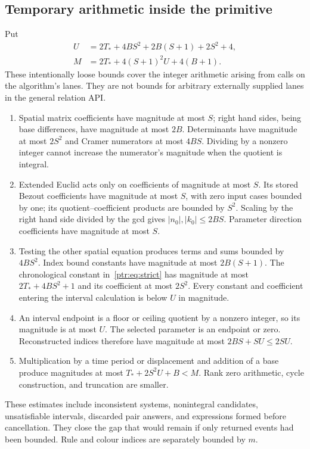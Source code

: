 \documentclass[11pt,letterpaper]{article}
\theoremstyle{definition}\newtheorem{definition}[theorem]{Definition}
\theoremstyle{remark}\newtheorem{remark}[theorem]{Remark}
\begin{document}
\subsection{Temporary arithmetic inside the primitive}
Put
\begin{align}\label{ptr:eq:intermediate}
 U&=2T_*+4BS^2+2B(S+1)+2S^2+4,\\
 M&=2T_*+4(S+1)^2U+4(B+1).\nonumber
\end{align}
These intentionally loose bounds cover the integer arithmetic arising from calls on the algorithm's lanes. They are not bounds for arbitrary externally supplied lanes in the general relation API.
\begin{enumerate}
\item Spatial matrix coefficients have magnitude at most $S$; right hand sides, being base differences, have magnitude at most $2B$. Determinants have magnitude at most $2S^2$ and Cramer numerators at most $4BS$. Dividing by a nonzero integer cannot increase the numerator's magnitude when the quotient is integral.
\item Extended Euclid acts only on coefficients of magnitude at most $S$. Its stored Bezout coefficients have magnitude at most $S$, with zero input cases bounded by one; its quotient--coefficient products are bounded by $S^2$. Scaling by the right hand side divided by the gcd gives $|n_0|,|k_0|\le2BS$. Parameter direction coefficients have magnitude at most $S$.
\item Testing the other spatial equation produces terms and sums bounded by $4BS^2$. Index bound constants have magnitude at most $2B(S+1)$. The chronological constant in~\eqref{ptr:eq:strict} has magnitude at most $2T_*+4BS^2+1$ and its coefficient at most $2S^2$. Every constant and coefficient entering the interval calculation is below $U$ in magnitude.
\item An interval endpoint is a floor or ceiling quotient by a nonzero integer, so its magnitude is at most $U$. The selected parameter is an endpoint or zero. Reconstructed indices therefore have magnitude at most $2BS+SU\le2SU$.
\item Multiplication by a time period or displacement and addition of a base produce magnitudes at most $T_*+2S^2U+B<M$. Rank zero arithmetic, cycle construction, and truncation are smaller.
\end{enumerate}
These estimates include inconsistent systems, nonintegral candidates, unsatisfiable intervals, discarded pair answers, and expressions formed before cancellation. They close the gap that would remain if only returned events had been bounded. Rule and colour indices are separately bounded by $m$.
\end{document}
